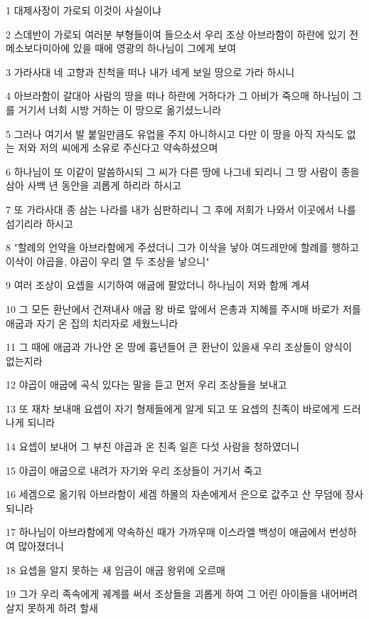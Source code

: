 \par 1 대제사장이 가로되 이것이 사실이냐
\par 2 스데반이 가로되 여러분 부형들이여 들으소서 우리 조상 아브라함이 하란에 있기 전 메소보다미아에 있을 때에 영광의 하나님이 그에게 보여
\par 3 가라사대 네 고향과 친척을 떠나 내가 네게 보일 땅으로 가라 하시니
\par 4 아브라함이 갈대아 사람의 땅을 떠나 하란에 거하다가 그 아비가 죽으매 하나님이 그를 거기서 너희 시방 거하는 이 땅으로 옮기셨느니라
\par 5 그러나 여기서 발 붙일만큼도 유업을 주지 아니하시고 다만 이 땅을 아직 자식도 없는 저와 저의 씨에게 소유로 주신다고 약속하셨으며
\par 6 하나님이 또 이같이 말씀하시되 그 씨가 다른 땅에 나그네 되리니 그 땅 사람이 종을 삼아 사백 년 동안을 괴롭게 하리라 하시고
\par 7 또 가라사대 종 삼는 나라를 내가 심판하리니 그 후에 저희가 나와서 이곳에서 나를 섬기리라 하시고
\par 8 "할례의 언약을 아브라함에게 주셨더니 그가 이삭을 낳아 여드레만에 할례를 행하고 이삭이 야곱을, 야곱이 우리 열 두 조상을 낳으니"
\par 9 여러 조상이 요셉을 시기하여 애굽에 팔았더니 하나님이 저와 함께 계셔
\par 10 그 모든 환난에서 건져내사 애굽 왕 바로 앞에서 은총과 지혜를 주시매 바로가 저를 애굽과 자기 온 집의 치리자로 세웠느니라
\par 11 그 때에 애굽과 가나안 온 땅에 흉년들어 큰 환난이 있을새 우리 조상들이 양식이 없는지라
\par 12 야곱이 애굽에 곡식 있다는 말을 듣고 먼저 우리 조상들을 보내고
\par 13 또 재차 보내매 요셉이 자기 형제들에게 알게 되고 또 요셉의 친족이 바로에게 드러나게 되니라
\par 14 요셉이 보내어 그 부친 야곱과 온 친족 일흔 다섯 사람을 청하였더니
\par 15 야곱이 애굽으로 내려가 자기와 우리 조상들이 거기서 죽고
\par 16 세겜으로 옮기워 아브라함이 세겜 하몰의 자손에게서 은으로 값주고 산 무덤에 장사되니라
\par 17 하나님이 아브라함에게 약속하신 때가 가까우매 이스라엘 백성이 애굽에서 번성하여 많아졌더니
\par 18 요셉을 알지 못하는 새 임금이 애굽 왕위에 오르매
\par 19 그가 우리 족속에게 궤계를 써서 조상들을 괴롭게 하여 그 어린 아이들을 내어버려 살지 못하게 하려 할새
